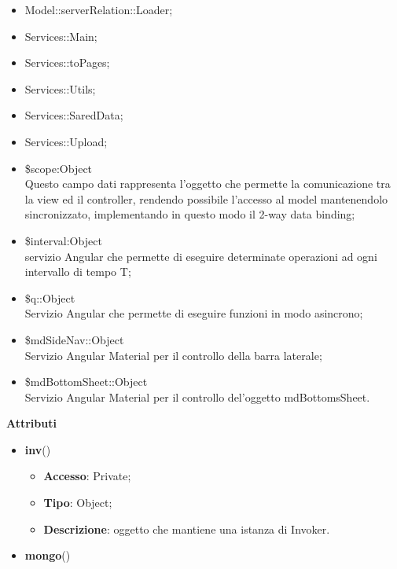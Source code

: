 {{\begin{itemize}
\begin{itemize}
				\item ConcretePortaAvantiCommand;
				\item ConcretePortaDietroCommand;
				\item ConcreteAddToMainPathCommand;
				\item ConcreteRemoveFromMainPathCommand
			\end{itemize}
			\item Model::\-serverRelation::\-Loader;
			\item Services::\-Main;
			\item Services::\-toPages;
			\item Services::\-Utils;
			\item Services::\-SaredData;
			\item Services::\-Upload;
			\item \$scope:Object\\
				\indent Questo campo dati rappresenta l’oggetto che permette la comunicazione tra la view ed il controller, rendendo possibile l’accesso al model mantenendolo sincronizzato, implementando in questo modo il 2-way data binding;
			\item \$interval:Object\\
				\indent servizio Angular che permette di eseguire determinate operazioni ad ogni intervallo di tempo T;
			\item \$q::\-Object\\
				\indent Servizio Angular che permette di eseguire funzioni in modo asincrono;
			\item \$mdSideNav::\-Object\\
				\indent Servizio Angular Material per il controllo della barra laterale;
			\item \$mdBottomSheet::\-Object\\
				\indent Servizio Angular Material per il controllo del'oggetto mdBottomsSheet.
		\end{itemize}
		\textbf{Attributi}\\
		\begin{itemize}
			\item \textbf{inv}()
			\begin{itemize}
				\item \textbf{Accesso}: Private;
				\item \textbf{Tipo}: Object;
				\item \textbf{Descrizione}: oggetto che mantiene una istanza di Invoker.
			\end{itemize}
			\item \textbf{mongo}()

\end{itemize}}}
